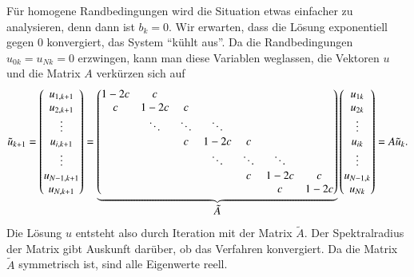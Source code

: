 Für homogene Randbedingungen wird die Situation etwas einfacher zu
analysieren, denn dann ist $b_k=0$.
Wir erwarten, dass die Lösung exponentiell gegen $0$ konvergiert,
das System ``kühlt aus''.
Da die Randbedingungen $u_{0k}=u_{Nk}=0$ erzwingen, kann man diese 
Variablen weglassen, die Vektoren $u$ und die Matrix $A$ verkürzen sich auf
\begin{equation}
\tilde{u}_{k+1}
=
\begin{pmatrix}
u_{1,k+1}\\
u_{2,k+1}\\
\vdots\\
u_{i,k+1}\\
\vdots\\
u_{N-1,k+1}\\
u_{N,k+1}
\end{pmatrix}
=
\underbrace{
\begin{pmatrix}
 1-2c &  c   &      &      &      &      &      \\
  c   & 1-2c &  c   &      &      &      &      \\
      &\ddots&\ddots&\ddots&      &      &      \\
      &      &  c   & 1-2c &  c   &      &      \\
      &      &      &\ddots&\ddots&\ddots&      \\
      &      &      &      &  c   & 1-2c &  c   \\
      &      &      &      &      &  c   & 1-2c \\
\end{pmatrix}}_{\displaystyle \tilde{A}\mathstrut}
\begin{pmatrix}
u_{1k}\\
u_{2k}\\
\vdots\\
u_{ik}\\
\vdots\\
u_{N-1,k}\\
u_{Nk}
\end{pmatrix}
=
A
\tilde{u}_k.
\end{equation}
Die Lösung $u$ entsteht also durch Iteration mit der Matrix $\tilde{A}$.
Der Spektralradius der Matrix gibt Auskunft darüber, ob das Verfahren
konvergiert.
Da die Matrix $\tilde{A}$ symmetrisch ist, sind alle Eigenwerte reell.
